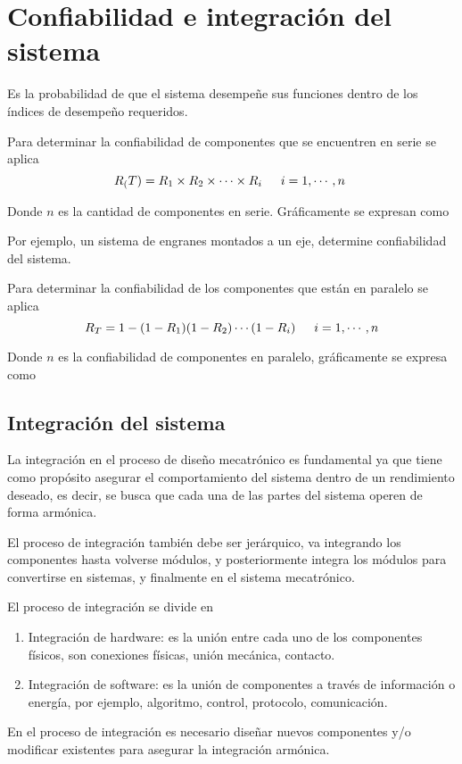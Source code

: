 \section{Confiabilidad e integración del sistema}

Es la probabilidad de que el sistema desempeñe sus funciones dentro de los índices de desempeño requeridos. 

Para determinar la confiabilidad de componentes que se encuentren en serie se aplica
\[
    R_(T) = R_{1} \times R_{2} \times \cdots \times R_{i} \text{ \;\;\; \( i = 1, \cdots, n \) }
\]

Donde \( n \) es la cantidad de componentes en serie. Gráficamente se expresan como

Por ejemplo, un sistema de engranes montados a un eje, determine confiabilidad del sistema.

Para determinar la confiabilidad de los componentes que están en paralelo se aplica
\[
    R_{T} = 1 - (1 - R_{1}) (1 - R_{2}) \cdots (1 - R_{i}) \text{ \;\;\; \( i = 1, \cdots, n \)}
\]

Donde \( n \) es la confiabilidad de componentes en paralelo, gráficamente se expresa como

\subsection{Integración del sistema}
La integración en el proceso de diseño mecatrónico es fundamental ya que tiene como propósito asegurar el comportamiento del sistema dentro de un rendimiento deseado, es decir, se busca que cada una de las partes del sistema operen de forma armónica. 

El proceso de integración también debe ser jerárquico, va integrando los componentes hasta volverse módulos, y posteriormente integra los módulos para convertirse en sistemas, y finalmente en el sistema mecatrónico. 

El proceso de integración se divide en
\begin{enumerate}
    \item Integración de hardware: es la unión entre cada uno de los componentes físicos, son conexiones físicas, unión mecánica, contacto. 
    
    \item Integración de software: es la unión de componentes a través de información o energía, por ejemplo, algoritmo, control, protocolo, comunicación.
\end{enumerate}

En el proceso de integración es necesario diseñar nuevos componentes y/o modificar existentes para asegurar la integración armónica. 